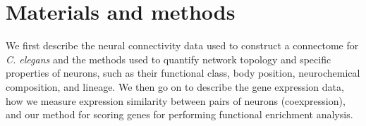 \documentclass[10pt,letterpaper]{article}
\begin{document}
\section*{Materials and methods}

We first describe the neural connectivity data used to construct a connectome for \textit{C. elegans} and the methods used to quantify network topology and specific properties of neurons, such as their functional class, body position, neurochemical composition, and lineage.
We then go on to describe the gene expression data, how we measure expression similarity between pairs of neurons (coexpression), and our method for scoring genes for performing functional enrichment analysis.



\end{document}
